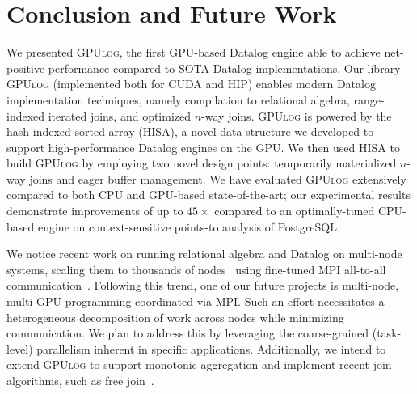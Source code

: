 \documentclass[nonacm,sigplan]{acmart}
\newcommand{\tool}{\textsc{GPUlog}}
\newcommand{\revised}[1]{{#1}}
\begin{document}
\section{Conclusion and Future Work}


We presented \tool{}, the first GPU-based Datalog engine able to achieve net-positive performance compared to SOTA Datalog implementations. Our library \tool{} (implemented both for CUDA and HIP) enables modern Datalog implementation techniques, namely compilation to relational algebra, range-indexed iterated joins, and optimized $n$-way joins. \tool{} is powered by the hash-indexed sorted array (HISA), a novel data structure we developed to support high-performance Datalog engines on the GPU. 
We then used HISA to build \tool{} by employing two novel design points: temporarily materialized $n$-way joins and eager buffer management. We have evaluated \tool{} extensively compared to both CPU and GPU-based state-of-the-art; our experimental results demonstrate improvements of up to $45\times$ compared to an optimally-tuned CPU-based engine on context-sensitive points-to analysis of \textsf{PostgreSQL}.

\revised{We notice recent work on running relational algebra and Datalog on multi-node systems, scaling them to thousands of nodes~\cite{sun2023communication, gilray2021compiling, kumar2020load, kumar2019distributed} using fine-tuned MPI all-to-all communication~\cite{fan2024configurable, fan2022optimizing}.
Following this trend, one of our future projects is multi-node, multi-GPU programming coordinated via MPI. Such an effort necessitates a heterogeneous decomposition of work across nodes while minimizing communication. We plan to address this by leveraging the coarse-grained (task-level) parallelism inherent in specific applications.} Additionally, we intend to extend \tool{} to support monotonic aggregation and implement recent join algorithms, such as free join~\cite{freejoin}.
\end{document}
